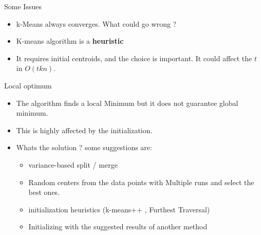 \documentclass[serif, aspectratio=169]{beamer}
\begin{document}
\begin{frame}{Some Issues}
    \begin{itemize}
        \item k-Means always converges. What could go wrong ?
        \item K-means algorithm is a \textbf{heuristic}
        \item It requires initial centroids, and the choice is important. It could affect the $t$ in $O(tkn)$.
        
        
        
    \end{itemize}
\end{frame}


\begin{frame}{Local optimum}
    \begin{itemize}
        \item The algorithm finds a local Minimum but it does not guarantee global minimum.
        \item This is highly affected by the initialization.
        \item Whats the solution ? some suggestions are:
        \begin{itemize}
            \item variance-based split / merge
            \item Random centers from the data points with Multiple runs and select the best ones.
            \item initialization heuristics (k-means++ , Furthest Traversal)
            \item Initializing with the suggested results of another method
        \end{itemize}
    \end{itemize}
\end{frame}
\end{document}
